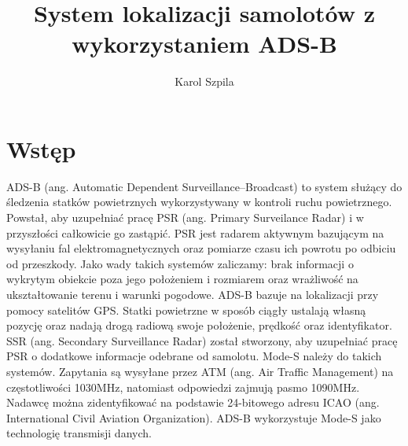 \documentclass[eng,printmode]{mgr}
\title{System lokalizacji samolotów z wykorzystaniem ADS-B}
\author{Karol Szpila}
\begin{document}

\maketitle %

\tableofcontents %

\let\cleardoublepage\clearpage %

\chapter{ Wstęp }
ADS-B (ang. Automatic Dependent Surveillance–Broadcast) to system służący do śledzenia statków powietrznych wykorzystywany w kontroli ruchu powietrznego. Powstał, aby uzupełniać pracę PSR (ang. Primary Surveilance Radar) i w przyszłości całkowicie go zastąpić. PSR jest radarem aktywnym bazującym na wysyłaniu fal elektromagnetycznych oraz pomiarze czasu ich powrotu po odbiciu od przeszkody. Jako wady takich systemów zaliczamy: brak informacji o wykrytym obiekcie poza jego położeniem i rozmiarem oraz wrażliwość na ukształtowanie terenu i warunki pogodowe. ADS-B bazuje na lokalizacji przy pomocy satelitów GPS. Statki powietrzne w sposób ciągły ustalają własną pozycję oraz nadają drogą radiową swoje położenie, prędkość oraz identyfikator.
\\


SSR (ang. Secondary Surveillance Radar) został stworzony, aby uzupełniać pracę PSR o dodatkowe informacje odebrane od samolotu. Mode-S należy do takich systemów. Zapytania są wysyłane przez ATM (ang. Air Traffic Management) na częstotliwości 1030MHz, natomiast odpowiedzi zajmują pasmo 1090MHz. Nadawcę można zidentyfikować na podstawie 24-bitowego adresu ICAO (ang. International Civil Aviation Organization). ADS-B wykorzystuje Mode-S jako technologię transmisji danych.
 
\end{document}
